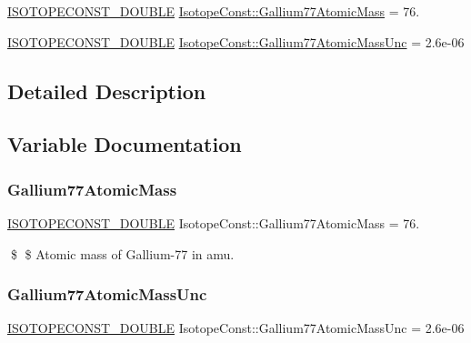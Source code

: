 \begin{DoxyCompactItemize}
\item 
\mbox{\hyperlink{group___isotope_const-_macros_ga8f45a7272ce02c0b4c65c44636ed719a}{I\+S\+O\+T\+O\+P\+E\+C\+O\+N\+S\+T\+\_\+\+D\+O\+U\+B\+LE}} \mbox{\hyperlink{group___isotope_const-_gallium-_ga77_ga58f6bd2bd115d8d06459766a5b9ded63}{Isotope\+Const\+::\+Gallium77\+Atomic\+Mass}} = 76.
\item 
\mbox{\hyperlink{group___isotope_const-_macros_ga8f45a7272ce02c0b4c65c44636ed719a}{I\+S\+O\+T\+O\+P\+E\+C\+O\+N\+S\+T\+\_\+\+D\+O\+U\+B\+LE}} \mbox{\hyperlink{group___isotope_const-_gallium-_ga77_ga7499e6de6f368402001b0d720e151ce4}{Isotope\+Const\+::\+Gallium77\+Atomic\+Mass\+Unc}} = 2.\+6e-\/06
\end{DoxyCompactItemize}


\subsection{Detailed Description}


\subsection{Variable Documentation}
\mbox{\label{group___isotope_const-_gallium-_ga77_ga58f6bd2bd115d8d06459766a5b9ded63}} 
\subsubsection{\texorpdfstring{Gallium77\+Atomic\+Mass}{Gallium77AtomicMass}}
{\footnotesize\ttfamily \mbox{\hyperlink{group___isotope_const-_macros_ga8f45a7272ce02c0b4c65c44636ed719a}{I\+S\+O\+T\+O\+P\+E\+C\+O\+N\+S\+T\+\_\+\+D\+O\+U\+B\+LE}} Isotope\+Const\+::\+Gallium77\+Atomic\+Mass = 76.}

\$ \$ Atomic mass of Gallium-\/77 in amu. \mbox{\label{group___isotope_const-_gallium-_ga77_ga7499e6de6f368402001b0d720e151ce4}} 
\subsubsection{\texorpdfstring{Gallium77\+Atomic\+Mass\+Unc}{Gallium77AtomicMassUnc}}
{\footnotesize\ttfamily \mbox{\hyperlink{group___isotope_const-_macros_ga8f45a7272ce02c0b4c65c44636ed719a}{I\+S\+O\+T\+O\+P\+E\+C\+O\+N\+S\+T\+\_\+\+D\+O\+U\+B\+LE}} Isotope\+Const\+::\+Gallium77\+Atomic\+Mass\+Unc = 2.\+6e-\/06}


